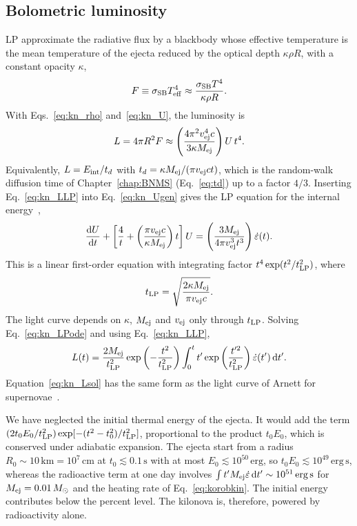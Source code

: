 \subsection{Bolometric luminosity}\label{sec:onezone_sol}

LP approximate the radiative flux by a blackbody whose effective temperature is the mean temperature of the ejecta reduced by the optical depth $\kappa\rho R$, with a constant opacity $\kappa$,
\begin{equation}\label{eq:kn_FLP}
  F\equiv\sigma_{\rm SB}T_{\rm eff}^4\approx\frac{\sigma_{\rm SB}T^4}{\kappa\rho R} .
\end{equation}
With Eqs.~\ref{eq:kn_rho} and~\ref{eq:kn_U}, the luminosity is
\begin{equation}\label{eq:kn_LLP}
  L=4\pi R^2F\approx\left(\frac{4\pi^2v_{\rm ej}^4c}{3\kappa M_{\rm ej}}\right)U\,t^4 .
\end{equation}
Equivalently, $L=E_{\rm int}/t_d$ with $t_d=\kappa M_{\rm ej}/(\pi v_{\rm ej}ct)$, which is the random-walk diffusion time of Chapter~\ref{chap:BNMS} (Eq.~\ref{eq:td}) up to a factor $4/3$.
Inserting Eq.~\ref{eq:kn_LLP} into Eq.~\ref{eq:kn_Ugen} gives the LP equation for the internal energy~\cite{li_transient_1998},
\begin{equation}\label{eq:kn_LPode}
  \frac{\mathrm{d}U}{\mathrm{d}t}+\left[\frac4t+\left(\frac{\pi v_{\rm ej}c}{\kappa M_{\rm ej}}\right)t\right]U=\left(\frac{3M_{\rm ej}}{4\pi v_{\rm ej}^3t^3}\right)\dot\varepsilon(t).
\end{equation}
This is a linear first-order equation with integrating factor $t^4\exp(t^2/t_{\rm LP}^2)$, where
\begin{equation}\label{eq:kn_tLP}
  t_{\rm LP}=\sqrt{\frac{2\kappa M_{\rm ej}}{\pi v_{\rm ej}c}}.
\end{equation}
The light curve depends on $\kappa$, $M_{\rm ej}$ and $v_{\rm ej}$ only through $t_{\rm LP}$.
Solving Eq.~\ref{eq:kn_LPode} and using Eq.~\ref{eq:kn_LLP},
\begin{equation}\label{eq:kn_Lsol}
  L(t)=\frac{2M_{\rm ej}}{t_{\rm LP}^2}\exp\left(-\frac{t^2}{t_{\rm LP}^2}\right)\int_0^t t'\exp\left(\frac{t'^2}{t_{\rm LP}^2}\right)\dot\varepsilon(t')\,\mathrm{d}t' .
\end{equation}
Equation~\ref{eq:kn_Lsol} has the same form as the light curve of Arnett for supernovae~\cite{arnett_type_1982}.

We have neglected the initial thermal energy of the ejecta.
It would add the term $(2t_0E_0/t_{\rm LP}^2)\exp[-(t^2-t_0^2)/t_{\rm LP}^2]$, proportional to the product $t_0E_0$, which is conserved under adiabatic expansion.
The ejecta start from a radius $R_0\sim10\,\mathrm{km}=10^{7}\,\mathrm{cm}$ at $t_0\lesssim0.1\,\mathrm{s}$ with at most $E_0\lesssim10^{50}\,\mathrm{erg}$, so $t_0E_0\lesssim10^{49}\,\mathrm{erg\,s}$, whereas the radioactive term at one day involves $\int t'M_{\rm ej}\dot\varepsilon\,\mathrm{d}t'\sim10^{51}\,\mathrm{erg\,s}$ for $M_{\rm ej}=0.01\,M_\odot$ and the heating rate of Eq.~\ref{eq:korobkin}.
The initial energy contributes below the percent level.
The kilonova is, therefore, powered by radioactivity alone.

